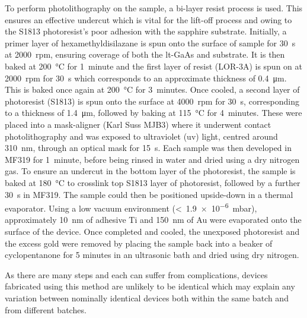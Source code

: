 To perform photolithography on the sample, a bi\nobreakdash-layer resist process is used. This ensures an effective undercut which is vital for the lift\nobreakdash-off process and owing to the S1813 photoresist's poor adhesion with the sapphire substrate. Initially, a primer layer of hexamethyldisilazane is spun onto the surface of sample for \SI{30}{s} at \SI{2000}{rpm}, ensuring coverage of both the \acrshort{lt}\nobreakdash-GaAs and substrate. It is then baked at \SI{200}{\celsius} for \SI{1}{minute} and the first layer of resist (LOR\nobreakdash-3A) is spun on at \SI{2000}{rpm} for \SI{30}{s} which corresponds to an approximate thickness of \SI{0.4}{\micro\metre}. This is baked once again at \SI{200}{\celsius} for \SI{3}{minutes}. Once cooled, a second layer of photoresist (S1813) is spun onto the surface at \SI{4000}{rpm} for \SI{30}{s}, corresponding to a thickness of \SI{1.4}{\micro\metre}, followed by baking at \SI{115}{\celsius} for \SI{4}{minutes}. These were placed into a mask\nobreakdash-aligner (Karl Suss MJB3) where it underwent contact photolithography and was exposed to ultraviolet (\acrshort{uv}) light, centred around \SI{310}{nm}, through an optical mask for \SI{15}{s}. Each sample was then developed in MF319 for \SI{1}{minute}, before being rinsed in water and dried using a dry nitrogen gas. 
To ensure an undercut in the bottom layer of the photoresist, the sample is baked at \SI{180}{\celsius} to crosslink top S1813 layer of photoresist, followed by a further \SI{30}{s} in MF319. The sample could then be positioned upside\nobreakdash-down in a thermal evaporator. Using a low vacuum environment (<~\SI{1.9e-6}{mbar}), approximately \SI{10}{nm} of adhesive Ti and \SI{150}{nm} of Au were evaporated onto the surface of the device. Once completed and cooled, the unexposed photoresist and the excess gold were removed by placing the sample back into a beaker of cyclopentanone for 5 minutes in an ultrasonic bath and dried using dry nitrogen.

As there are many steps and each can suffer from complications, devices fabricated using this method are unlikely to be identical which may explain any variation between nominally identical devices both within the same batch and from different batches.

